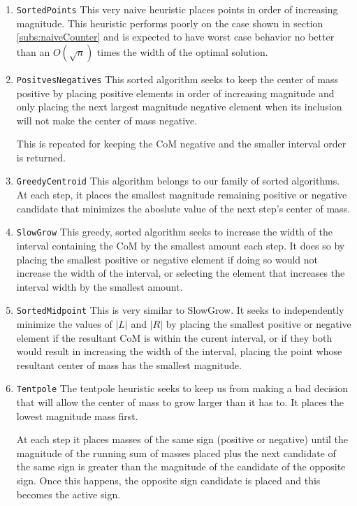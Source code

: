 \documentclass[11pt,twocolumn]{article}
\begin{document}
\begin{enumerate}
\item \texttt{SortedPoints}
This very naive heuristic places points in order of increasing magnitude.  This heuristic performs poorly on the case shown in section \ref{subs:naiveCounter} and is expected to have worst case behavior no better than an $O(\sqrt{n})$ times the width of the optimal solution.

\item \texttt{PositvesNegatives}
  This sorted algorithm seeks to keep the center of mass positive by placing positive elements in order of increasing magnitude and only placing the next largest magnitude negative element when its inclusion will not make the center of mass negative.

This is repeated for keeping the CoM negative and the smaller interval order is returned.

\item \texttt{GreedyCentroid}
  This algorithm belongs to our family of sorted algorithms.  At each step, it places the smallest magnitude remaining positive or negative candidate that minimizes the aboslute value of the next step's center of mass. 

\item \texttt{SlowGrow}
This greedy, sorted algorithm seeks to increase the width of the interval containing the CoM by the smallest amount each step.  It does so by placing the smallest positive or negative element if doing so would not increase the width of the interval, or selecting the element that increases the interval width by the smallest amount. 

\item \texttt{SortedMidpoint}
This is very similar to SlowGrow.  It seeks to independently minimize the values of $|L|$ and $|R|$ by placing the smallest positive or negative element if the resultant CoM is within the curent interval, or if they both would result in increasing the width of the interval, placing the point whose resultant center of mass has the smallest magnitude.

\item \texttt{Tentpole}
The tentpole heuristic seeks to keep us from making a bad decision that will allow the center of mass to grow larger than it has to.  It places the lowest magnitude mass first.  

At each step it places masses of the same sign (positive or negative) until the magnitude of the running sum of masses placed plus the next candidate of the same sign is greater than the magnitude of the candidate of the opposite sign.  Once this happens, the opposite sign candidate is placed and this becomes the active sign.


\end{enumerate}
\end{document}
